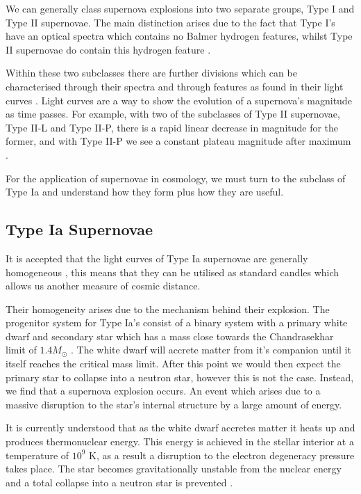 \documentclass[twocolumn]{revtex4}
\begin{document}
We can generally class supernova explosions into two separate groups, Type I and Type II supernovae. The main distinction arises due to the fact that Type I's have an optical spectra which contains no Balmer hydrogen features, whilst Type II supernovae do contain this hydrogen feature \cite{mod_ast}. 

Within these two subclasses there are further divisions which can be characterised through their spectra and through features as found in their light curves \cite{obs_phys_class_sn}. Light curves are a way to show the evolution of a supernova's magnitude as time passes. For example, with two of the subclasses of Type II supernovae, Type II-L and Type II-P, there is a rapid linear decrease in magnitude for the former, and with Type II-P we see a constant plateau magnitude after maximum \cite{mod_ast}.

For the application of supernovae in cosmology, we must turn to the subclass of Type Ia and understand how they form plus how they are useful. 

\vspace{-3ex}
\subsection{Type Ia Supernovae}
\vspace{-2ex}
It is accepted that the light curves of Type Ia supernovae are generally homogeneous \cite{posn}, this means that they can be utilised as standard candles which allows us another measure of cosmic distance. 

Their homogeneity arises due to the mechanism behind their explosion. The progenitor system for Type Ia's consist of a binary system with a primary white dwarf and secondary star which has a mass close towards the Chandrasekhar limit of $1.4 M_{\odot}$ \cite{mod_ast, posn}. The white dwarf will accrete matter from it's companion until it itself reaches the critical mass limit. After this point we would then expect the primary star to collapse into a neutron star, however this is not the case. Instead, we find that a supernova explosion occurs. An event which arises due to a massive disruption to the star's internal structure by a large amount of energy.

It is currently understood that as the white dwarf accretes matter it heats up and produces thermonuclear energy. This energy is achieved in the stellar interior at a temperature of $10^9$ K, as a result a disruption to the electron degeneracy pressure takes place. The star becomes gravitationally unstable from the nuclear energy and a total collapse into a neutron star is prevented \cite{longair, posn}.
\end{document}
